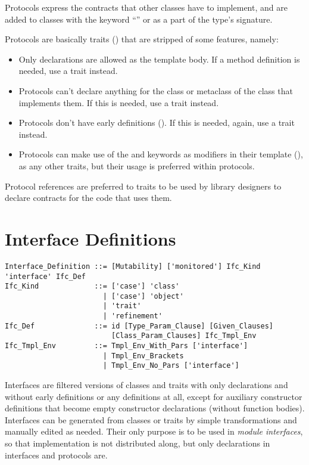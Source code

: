 Protocols express the contracts that other classes have to implement, and are added to classes with the keyword ``'' or as a part of the type's signature. 

Protocols are basically traits () that are stripped of some features, namely: 
\begin{itemize}
  \item Only declarations are allowed as the template body. If a method definition is needed, use a trait instead. 

  \item Protocols can't declare anything for the class or metaclass of the class that implements them. If this is needed, use a trait instead. 

  \item Protocols don't have early definitions (). If this is needed, again, use a trait instead. 

  \item Protocols can make use of the  and  keywords as modifiers in their template (), as any other traits, but their usage is preferred within protocols. 
\end{itemize}

Protocol references are preferred to traits to be used by library designers to declare contracts for the code that uses them. 





\section{Interface Definitions}
\label{sec:interfaces}

\grammar\begin{lstlisting}
Interface_Definition ::= [Mutability] ['monitored'] Ifc_Kind 'interface' Ifc_Def
Ifc_Kind             ::= ['case'] 'class' 
                       | ['case'] 'object'
                       | 'trait'
                       | 'refinement'
Ifc_Def              ::= id [Type_Param_Clause] [Given_Clauses]
                         [Class_Param_Clauses] Ifc_Tmpl_Env
Ifc_Tmpl_Env         ::= Tmpl_Env_With_Pars ['interface']
                       | Tmpl_Env_Brackets
                       | Tmpl_Env_No_Pars ['interface']
\end{lstlisting}

Interfaces are filtered versions of classes and traits with only declarations and without early definitions or any definitions at all, except for auxiliary constructor definitions that become empty constructor declarations (without function bodies). Interfaces can be generated from classes or traits by simple transformations and manually edited as needed. Their only purpose is to be used in {\em module interfaces}, so that implementation is not distributed along, but only declarations in interfaces and protocols are. 





